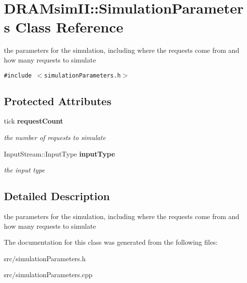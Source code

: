\section{DRAMsimII::SimulationParameters Class Reference}
\label{class_d_r_a_msim_i_i_1_1_simulation_parameters}
the parameters for the simulation, including where the requests come from and how many requests to simulate  


{\tt \#include $<$simulationParameters.h$>$}

\subsection*{Protected Attributes}
\begin{CompactItemize}
\item 
tick {\bf requestCount}\label{class_d_r_a_msim_i_i_1_1_simulation_parameters_348bf65bc4e540f16bec50b02f2bf39e}

\begin{CompactList}\small\item\em the number of requests to simulate \item\end{CompactList}\item 
InputStream::InputType {\bf inputType}\label{class_d_r_a_msim_i_i_1_1_simulation_parameters_f495ba14ce2d58a65a35ff5d6222c645}

\begin{CompactList}\small\item\em the input type \item\end{CompactList}\end{CompactItemize}


\subsection{Detailed Description}
the parameters for the simulation, including where the requests come from and how many requests to simulate 

The documentation for this class was generated from the following files:\begin{CompactItemize}
\item 
src/simulationParameters.h\item 
src/simulationParameters.cpp\end{CompactItemize}
